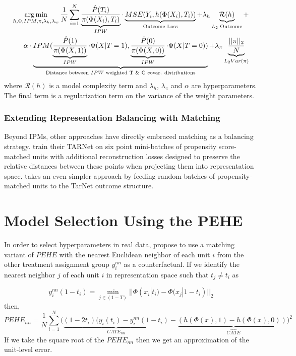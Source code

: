 \begin{equation}
\begin{split}
\operatorname*{arg\,min}_{h,\Phi,IPM,\pi,\lambda_h,\lambda_w}\frac{1}{N}\sum_{i=1}^N \underbrace{\frac{\hat{P}(T_i)}{\pi(\Phi(X_i),T_i)}}_{IPW}\cdot \underbrace{MSE(Y_i,h(\Phi(X_i),T_i))}_{\text{Outcome Loss}} + \lambda_h \underbrace{\mathcal{R}(h)}_{\text{$L_2$ Outcome}}+\\
\alpha\cdot \underbrace{IPM(\underbrace{\frac{\hat{P}(1)}{\pi(\Phi(X,1))}}_{IPW}\cdot\Phi(X|T=1),\underbrace{\frac{\hat{P}(0)}{\pi(\Phi(X,0))}}_{IPW}\cdot\Phi(X|T=0))}_{\text{Distance between $IPW$ weighted T \& C covar. distributions}}+\lambda_\pi\underbrace{\frac{||\pi||_2}{N}}_{L_2   Var(\pi)}
\end{split}
\end{equation}
where $\mathcal{R}(h)$ is a model complexity term and $\lambda_h$, $\lambda_\pi$ and $\alpha$ are hyperparameters. The final term is a regularization term on the variance of the weight parameters.

\subsubsection{Extending Representation Balancing with Matching}
Beyond IPMs, other approaches have directly embraced matching as a balancing strategy. \citet{Yao2018} train their TARNet on six point mini-batches of propensity score-matched units with additional reconstruction losses designed to preserve the relative distances between these points when projecting them into representation space. \citet{Schwab2018} takes an even simpler approach by feeding random batches of propensity-matched units to the TarNet outcome structure.

\section{Model Selection Using the PEHE}
\label{appendix:peheselection}
In order to select hyperparameters in real data, \citet{johannson2020} propose to use a matching variant of $PEHE$ with the nearest Euclidean neighbor of each unit $i$ from the other treatment assignment group $y_i^{nn}$ as a counterfactual. If we identify the nearest neighbor $j$ of each unit $i$ in representation space such that $t_j\neq t_i$ as

  $$y_i^{nn}(1-t_i) = \min_{j\in (1-T)}||\Phi(x_i|t_i)-\Phi(x_j|1-t_i)||_2$$
 then,
$$PEHE_{nn}=\frac{1}{N}\sum_{i=1}^N{(\underbrace{(1-2t_i)(y_i(t_i)-y_i^{nn}(1-t_i)}_{CATE_{nn}}-\underbrace{(h(\Phi(x),1)-h(\Phi(x),0)))}_{\hat{CATE}}}^2$$
If we take the square root of the $PEHE_{nn}$ then we get an approximation of the unit-level error.

